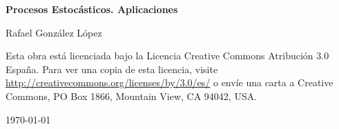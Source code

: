 \documentclass[twoside]{report}
\theoremstyle{definition}
\numberwithin{equation}{section}
\begin{document}
\begin{titlepage}
	\centering
	{\huge\bfseries Procesos Estocásticos. Aplicaciones\par}
	\vspace{2cm}
	{\Large Rafael González López\par}
	\vfill
	Esta obra está licenciada bajo la Licencia Creative Commons Atribución 3.0 España. Para ver una copia de esta licencia, visite \url{http://creativecommons.org/licenses/by/3.0/es/} o envíe una carta a Creative Commons, PO Box 1866, Mountain View, CA 94042, USA.

	{\large \today\par}
\end{titlepage}
\tableofcontents
\addtocounter{chapter}{-1}



\end{document}
